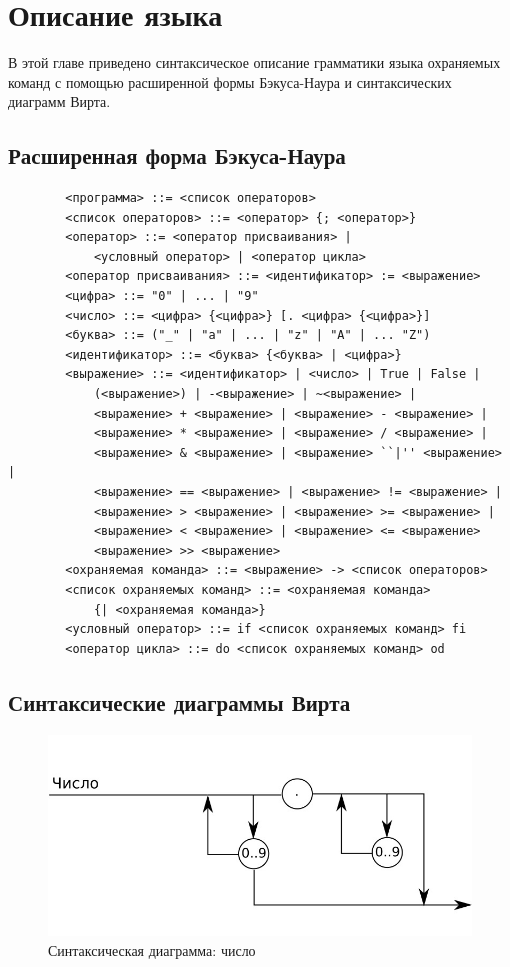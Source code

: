 \chapter{Описание языка} \label{ch1}
В этой главе приведено синтаксическое описание грамматики языка охраняемых команд с помощью
расширенной формы Бэкуса-Наура и синтаксических диаграмм Вирта.

\section{Расширенная форма Бэкуса-Наура}
	\begin{verbatim}
	    <программа> ::= <список операторов>
	    <список операторов> ::= <оператор> {; <оператор>}
	    <оператор> ::= <оператор присваивания> |
	        <условный оператор> | <оператор цикла>
	    <оператор присваивания> ::= <идентификатор> := <выражение>
    	<цифра> ::= "0" | ... | "9"
    	<число> ::= <цифра> {<цифра>} [. <цифра> {<цифра>}]
    	<буква> ::= ("_" | "a" | ... | "z" | "A" | ... "Z")
    	<идентификатор> ::= <буква> {<буква> | <цифра>}
	    <выражение> ::= <идентификатор> | <число> | True | False |
	        (<выражение>) | -<выражение> | ~<выражение> |
	        <выражение> + <выражение> | <выражение> - <выражение> |
	        <выражение> * <выражение> | <выражение> / <выражение> |
	        <выражение> & <выражение> | <выражение> ``|'' <выражение> |
	        <выражение> == <выражение> | <выражение> != <выражение> |
	        <выражение> > <выражение> | <выражение> >= <выражение> |
	        <выражение> < <выражение> | <выражение> <= <выражение>
	        <выражение> >> <выражение>
	    <охраняемая команда> ::= <выражение> -> <список операторов>
	    <список охраняемых команд> ::= <охраняемая команда> 
	        {| <охраняемая команда>}
	    <условный оператор> ::= if <список охраняемых команд> fi
	    <оператор цикла> ::= do <список охраняемых команд> od
	\end{verbatim}

\section{Синтаксические диаграммы Вирта}
	\begin{figure}[H]
	\begin{center}
		\includegraphics[scale=0.5]{my_folder/images/virth/number}
		\caption{Синтаксическая диаграмма: число}
	\end{center}
    \end{figure}
    
